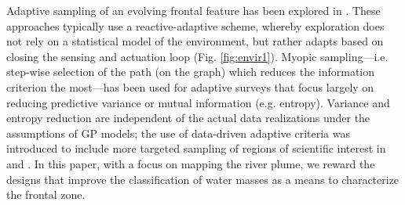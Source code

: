 \documentclass[aoas]{imsart}
\begin{document}





Adaptive sampling of an evolving frontal feature has been explored in
\cite{fronts11,Zhang2012,Pinto2018,costa19}. These approaches
typically use a reactive-adaptive scheme, whereby exploration does not
rely on a statistical model of the environment, but rather adapts
based on closing the sensing and actuation loop
(Fig. \ref{fig:envir1}). Myopic sampling—i.e. step-wise
selection of the path (on the graph) which reduces the information
criterion the most—has been used for adaptive surveys
\citep{singh2009efficient,Binney2013} that focus largely on reducing
predictive variance or mutual information (e.g. entropy). Variance and
entropy reduction are independent of the actual data realizations
under the assumptions of GP models; the use of data-driven adaptive
criteria was introduced to include more targeted sampling of regions
of scientific interest in \cite{Low2009} and \cite{fossuminformation}.
In this paper, with a focus on mapping the river plume, we reward
the designs that improve the classification of water masses as a
means to characterize the frontal zone.
\end{document}

